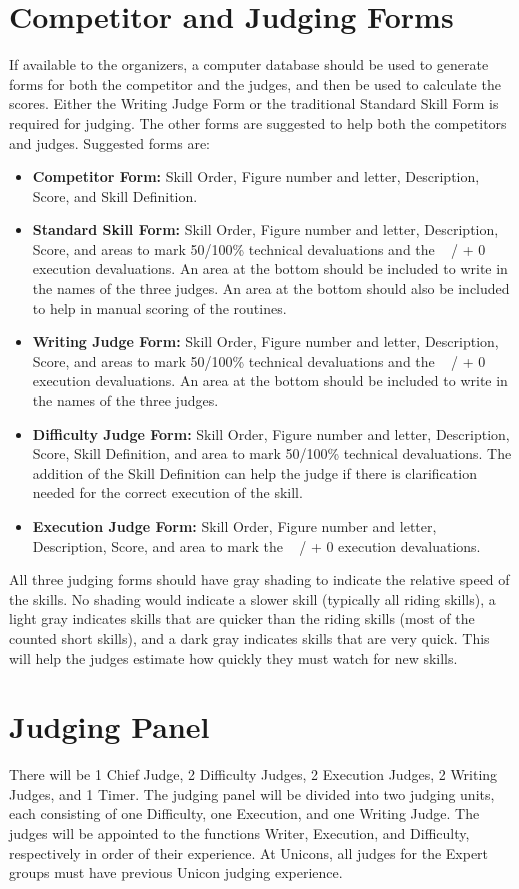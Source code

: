\section{Competitor and Judging Forms}

If available to the organizers, a computer database should be used to generate forms for both the competitor and the judges, and then be used to calculate the scores.
Either the Writing Judge Form or the traditional Standard Skill Form is required for judging.
The other forms are suggested to help both the competitors and judges.
Suggested forms are: 
\begin{itemize}
\item \textbf{Competitor Form:} Skill Order, Figure number and letter, Description, Score, and Skill Definition.
\item \textbf{Standard Skill Form:} Skill Order, Figure number and letter, Description, Score, and areas to mark 50/100\% technical devaluations and the ~ / + 0 execution devaluations.
An area at the bottom should be included to write in the names of the three judges.
An area at the bottom should also be included to help in manual scoring of the routines.
\item \textbf{Writing Judge Form:} Skill Order, Figure number and letter, Description, Score, and areas to mark 50/100\% technical devaluations and the ~ / + 0 execution devaluations.
An area at the bottom should be included to write in the names of the three judges.
\item \textbf{Difficulty Judge Form:} Skill Order, Figure number and letter, Description, Score, Skill Definition, and area to mark 50/100\% technical devaluations.
The addition of the Skill Definition can help the judge if there is clarification needed for the correct execution of the skill.
\item \textbf{Execution Judge Form:} Skill Order, Figure number and letter, Description, Score, and area to mark the ~ / + 0 execution devaluations.
\end{itemize}

All three judging forms should have gray shading to indicate the relative speed of the skills.
No shading would indicate a slower skill (typically all riding skills), a light gray indicates skills that are quicker than the riding skills (most of the counted short skills), and a dark gray indicates skills that are very quick.
This will help the judges estimate how quickly they must watch for new skills.

\section{Judging Panel \label{sec:freestyle_std-judging-panel}}
There will be 1 Chief Judge, 2 Difficulty Judges, 2 Execution Judges, 2 Writing Judges, and 1 Timer.
The judging panel will be divided into two judging units, each consisting of one Difficulty, one Execution, and one Writing Judge.
The judges will be appointed to the functions Writer, Execution, and Difficulty, respectively in order of their experience.
At Unicons, all judges for the Expert groups must have previous Unicon judging experience.

